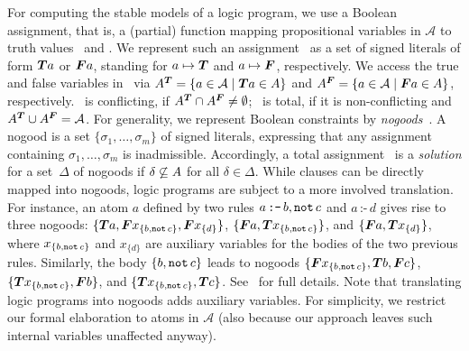 For computing the stable models of a logic program, we use
a Boolean assignment, that is, a (partial) function mapping propositional variables in $\mathcal{A}$
to truth values \true\ and \false.
We represent such an assignment \ass\ as a set of signed literals of form $\boldsymbol{T}{a}$ or $\boldsymbol{F}{a}$,
standing for $a\mapsto\boldsymbol{T}$ and $a\mapsto\boldsymbol{F}$, respectively.
%
We access the true and false variables in \ass\ via
\(
{A}^{\boldsymbol{T}}
=
\{a\in\mathcal{A}\mid\boldsymbol{T}{a}\in A\}
\)
and
\(
{A}^{\boldsymbol{F}}
=
\{a\in\mathcal{A}\mid\boldsymbol{F}{a}\in A\}
\), respectively.
%
\ass\ is conflicting, if ${A}^{\boldsymbol{T}}\cap{\ensuremath{A}}^{\boldsymbol{F}}\neq\emptyset$;
\ass\ is total, if it is non-conflicting and ${A}^{\boldsymbol{T}}\cup{\ensuremath{A}}^{\boldsymbol{F}}=\mathcal{A}$.
%
For generality, we represent Boolean constraints by \emph{nogoods}~\cite{dechter03}.
A nogood is a set $\{\sigma_1,\dots,\sigma_m\}$ of signed literals,
expressing that any assignment containing $\sigma_1,\dots,\sigma_m$ is inadmissible.
Accordingly,
a total assignment \ass\ is a \emph{solution} for a set~$\Delta$ of nogoods
if $\delta\not\subseteq A$ for all $\delta\in\Delta$.
%
While clauses can be directly mapped into nogoods,
logic programs are subject to a more involved translation.
For instance, 
an atom $a$ defined by two rules $a\,\texttt{:-}\,b,{\mathtt{not}\,{c}}$ and $a\,\texttt{:-}\,d$
gives rise to three nogoods:
$\{\boldsymbol{T}{a},\boldsymbol{F}{x_{\{b,{\mathtt{not}\,{c}}\}}},\boldsymbol{F}{x_{\{d\}}}\}$,
$\{\boldsymbol{F}{a},\boldsymbol{T}{x_{\{b,{\mathtt{not}\,{c}}\}}}\}$, and
$\{\boldsymbol{F}{a},\boldsymbol{T}{x_{\{d\}}}\}$,
where $x_{\{b,{\mathtt{not}\,{c}}\}}$ and $x_{\{d\}}$ are auxiliary variables for the bodies of the two previous rules.
Similarly, the body ${\{b,{\mathtt{not}\,{c}}\}}$ leads to nogoods
$\{\boldsymbol{F}{x_{\{b,{\mathtt{not}\,{c}}\}}},\boldsymbol{T}{b},\boldsymbol{F}{c}\}$,
$\{\boldsymbol{T}{x_{\{b,{\mathtt{not}\,{c}}\}}},\boldsymbol{F}{b}\}$, and
$\{\boldsymbol{T}{x_{\{b,{\mathtt{not}\,{c}}\}}},\boldsymbol{T}{c}\}$.
See~\cite{gekakasc12a} for full details.
%
Note that translating logic programs into nogoods adds auxiliary variables.
For simplicity, we restrict our formal elaboration to atoms in $\mathcal{A}$
(also because our approach leaves such internal variables unaffected anyway).



